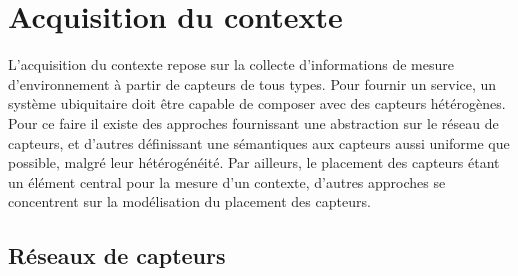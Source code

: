 

\section{Acquisition du contexte}

L'acquisition du contexte repose sur la collecte d'informations de mesure d'environnement à partir de capteurs de tous types. Pour fournir un service, un système ubiquitaire doit être capable de composer avec des capteurs hétérogènes. Pour ce faire il existe des approches fournissant une abstraction sur le réseau de capteurs, et d'autres définissant une sémantiques aux capteurs aussi uniforme que possible, malgré leur hétérogénéité. Par ailleurs, le placement des capteurs étant un élément central pour la mesure d'un contexte, d'autres approches se concentrent sur la modélisation du placement des capteurs. 

\subsection{Réseaux de capteurs}

